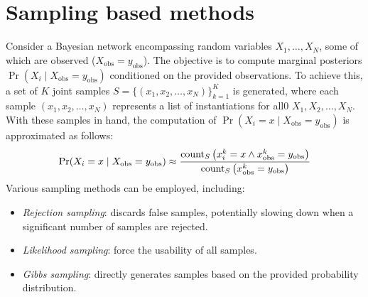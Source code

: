 \section{Sampling based methods}

Consider a Bayesian network encompassing random variables $X_1, \dots, X_N$, some of which are observed ($X_{\text{obs}}=y_{\text{obs}}$). 
The objective is to compute marginal posteriors $\Pr(X_i\mid X_{\text{obs}}=y_{\text{obs}})$ conditioned on the provided observations.
To achieve this, a set of $K$ joint samples $S=\{(x_1,x_2,\dots,x_N)\}_{k=1}^K$ is generated, where each sample $(x_1,x_2,\dots,x_N)$ represents a list of instantiations for all0 $X_1,X_2,\dots,X_N$. 
With these samples in hand, the computation of $\Pr(X_i=x\mid X_{\text{obs}}=y_{\text{obs}})$ is approximated as follows:
\[\Pr(X_i=x\mid X_{\text{obs}}=y_{\text{obs}}) \approx \dfrac{\textnormal{count}_S \left(x_i^k=x \land x_{\text{obs}}^k=y_{\text{obs}}\right)}{\textnormal{count}_S \left(x_{\text{obs}}^k=y_{\text{obs}}\right)}\]
Various sampling methods can be employed, including:
\begin{itemize}
    \item \textit{Rejection sampling}: discards false samples, potentially slowing down when a significant number of samples are rejected.
    \item \textit{Likelihood sampling}: force the usability of all samples.
    \item \textit{Gibbs sampling}: directly generates samples based on the provided probability distribution.
\end{itemize}

